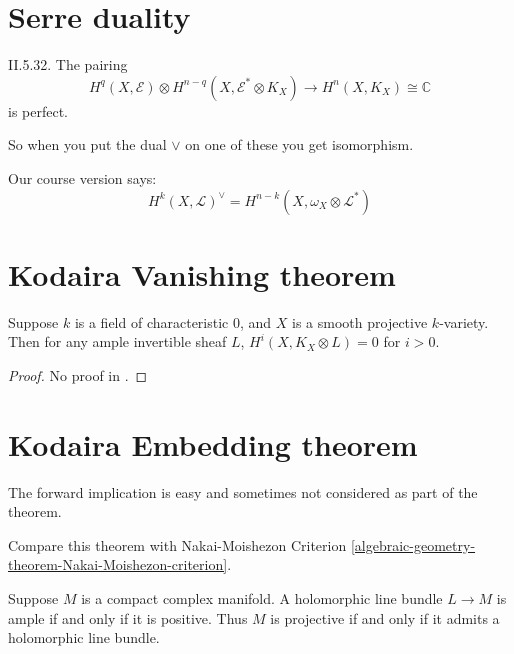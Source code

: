 \section{Serre duality}
\label{section-serre-duality}

\begin{theorem}
\label{theorem-serre-duality}
\cite{voi} II.5.32. The pairing
$$
H^q(X,\mathcal{E})\otimes
H^{n-q}(X,\mathcal{E}^*\otimes K_X)\to H^{n}(X,K_X)\cong\mathbb{C}
$$
is perfect.
\end{theorem}

So when you put the dual \(\vee\) on one of these you get isomorphism.

Our course version says:
$$
H^{k}(X,\mathcal{L})^{\vee}=H^{n-k}(X,\omega_X \otimes \mathcal{L}^*)
$$
\section{Kodaira Vanishing theorem}
\label{section-Kodaira-vanishing-theorem}

\begin{theorem}
\label{theorem-Kodaira-vanishing}
\begin{reference}
\cite[21.5.8]{sea}
\end{reference}
Suppose $k$ is a field of characteristic 0, and $X$ is a
smooth projective $k$-variety. Then for any ample invertible sheaf $L$,
$H^{i}(X,K_X \otimes L)=0$ for $i>0$.
\end{theorem}

\begin{proof}
No proof in \cite{sea}.
\end{proof}

\section{Kodaira Embedding theorem}
\label{section-Kodaira-Embedding-theorem}

The forward implication is easy and sometimes not considered as part of the
theorem.

Compare this theorem with Nakai-Moishezon Criterion
\ref{algebraic-geometry-theorem-Nakai-Moishezon-criterion}.

\begin{theorem}
\label{theorem-Kodaira-embedding}
\begin{reference}
\cite[Theorem 10.12]{lec}
\end{reference}
Suppose $M$ is a compact complex manifold. A holomorphic line bundle $L\to M$ is
ample if and only if it is positive. Thus $M$ is projective if and only if it
admits a holomorphic line bundle.
\end{theorem}

